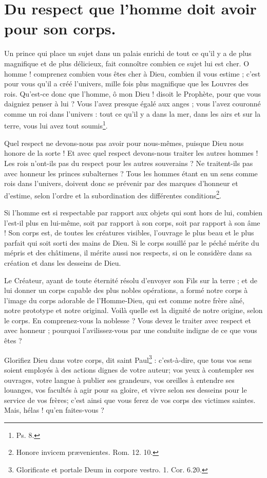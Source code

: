 \documentclass[instructions.tex]{subfiles}
\begin{document}
 
\chapter{Du respect que l’homme doit avoir pour son corps.}
 
\primo Un prince qui place un sujet dans un palais enrichi de tout ce qu’il y a de plus magnifique et de plus délicieux, fait connoître combien ce sujet lui est cher. O homme ! comprenez combien vous êtes cher à Dieu, combien il vous estime ; c’est pour vous qu’il a créé l’univers, mille fois plus magnifique que les Louvres des rois. Qu’est-ce donc que l’homme, ô mon Dieu ! disoit le Prophète, pour que vous daigniez penser à lui ? Vous l’avez presque égalé aux anges ; vous l’avez couronné comme un roi dans l’univers : tout ce qu’il y a dans la mer, dans les airs et sur la terre, vous lui avez tout soumis\footnote{Ps. 8.}.
 
Quel respect ne devons-nous pas avoir pour nous-mêmes, puisque Dieu nous honore de la sorte ! Et avec quel respect devons-nous traiter les autres hommes ! Les rois n’ont-ils pas du respect pour les autres souverains ? Ne traitent-ils pas avec honneur les princes subalternes ? Tous les hommes étant en un sens comme rois dans l’univers, doivent donc se prévenir par des marques d’honneur et d’estime, selon l’ordre et la subordination des différentes conditions\footnote{Honore invicem prævenientes. Rom. 12. 10.}.
 
\secundo Si l’homme est si respectable par rapport aux objets qui sont hors de lui, combien l’est-il plus en lui-même, soit par rapport à son corps, soit par rapport à son âme ! Son corps est, de toutes les créatures visibles, l’ouvrage le plus beau et le plus parfait qui soit sorti des mains de Dieu. Si le corps souillé par le péché mérite du mépris et des châtimens, il mérite aussi nos respects, si on le considère dans sa création et dans les desseins de Dieu.
 
Le Créateur, ayant de toute éternité résolu d’envoyer son Fils sur la terre ; et de lui donner un corps capable des plus nobles opérations, a formé notre corps à l’image du corps adorable de l’Homme-Dieu, qui est comme notre frère aîné, notre prototype et notre original. Voilà quelle est la dignité de notre origine, selon le corps. En comprenez-vous la noblesse ? Vous devez le traiter avec respect et avec honneur ; pourquoi l’avilissez-vous par une conduite indigne de ce que vous êtes ?
 
Glorifiez Dieu dans votre corps, dit saint Paul\footnote{Glorificate et portale Deum in corpore vestro. 1. Cor. 6.20.} : c’est-à-dire, que tous vos sens soient employés à des actions dignes de votre auteur; vos yeux à contempler ses ouvrages, votre langue à publier ses grandeurs, vos oreilles à entendre ses louanges, vos facultés à agir pour sa gloire, et vivre selon ses desseins pour le service de vos frères; c’est ainsi que vous ferez de vos corps des victimes saintes. Mais, hélas ! qu’en faites-vous ?
 
\end{document}
